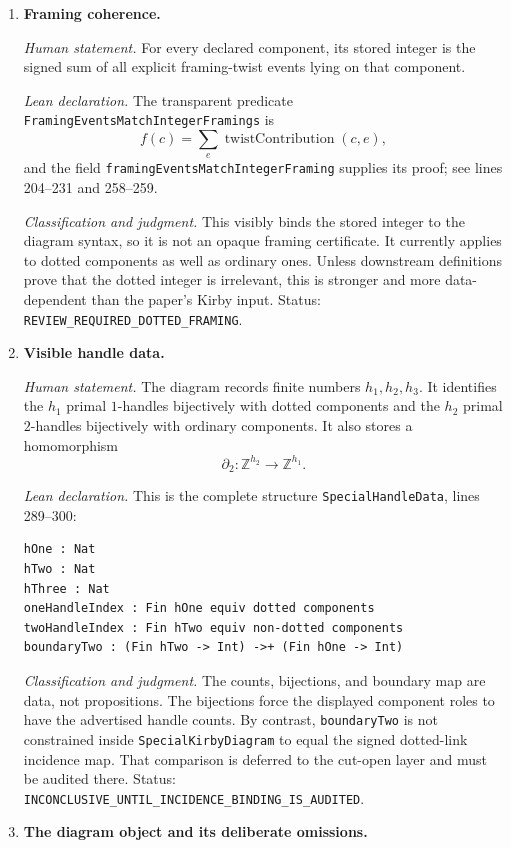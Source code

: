 \begin{enumerate}[label=\textbf{K\arabic*.},leftmargin=*]
\item \textbf{Framing coherence.}

\emph{Human statement.}
For every declared component, its stored integer is the signed sum of all
explicit framing-twist events lying on that component.

\emph{Lean declaration.}
The transparent predicate \nolinkurl{FramingEventsMatchIntegerFramings} is
\[
 f(c)=\sum_e \operatorname{twistContribution}(c,e),
\]
and the field \nolinkurl{framingEventsMatchIntegerFraming} supplies its proof;
see lines 204--231 and 258--259.

\emph{Classification and judgment.}
This visibly binds the stored integer to the diagram syntax, so it is not an
opaque framing certificate.  It currently applies to dotted components as
well as ordinary ones.  Unless downstream definitions prove that the dotted
integer is irrelevant, this is stronger and more data-dependent than the
paper's Kirby input.  Status:
\nolinkurl{REVIEW_REQUIRED_DOTTED_FRAMING}.

\item \textbf{Visible handle data.}

\emph{Human statement.}
The diagram records finite numbers $h_1,h_2,h_3$.  It identifies the $h_1$
primal $1$-handles bijectively with dotted components and the $h_2$ primal
$2$-handles bijectively with ordinary components.  It also stores a homomorphism
\[
 \partial_2\colon \mathbb Z^{h_2}\longrightarrow\mathbb Z^{h_1}.
\]

\emph{Lean declaration.}
This is the complete structure \texttt{SpecialHandleData}, lines 289--300:
\begin{verbatim}
hOne : Nat
hTwo : Nat
hThree : Nat
oneHandleIndex : Fin hOne equiv dotted components
twoHandleIndex : Fin hTwo equiv non-dotted components
boundaryTwo : (Fin hTwo -> Int) ->+ (Fin hOne -> Int)
\end{verbatim}

\emph{Classification and judgment.}
The counts, bijections, and boundary map are data, not propositions.  The
bijections force the displayed component roles to have the advertised handle
counts.  By contrast, \texttt{boundaryTwo} is not constrained inside
\texttt{SpecialKirbyDiagram} to equal the signed dotted-link incidence map.
That comparison is deferred to the cut-open layer and must be audited there.
Status: \nolinkurl{INCONCLUSIVE_UNTIL_INCIDENCE_BINDING_IS_AUDITED}.

\item \textbf{The diagram object and its deliberate omissions.}


\end{enumerate}
